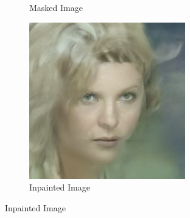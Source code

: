 \begin{figure}[H]
\begin{subfigure}[b]{0.25\textwidth}
        \caption{Masked Image}
    \end{subfigure}
    \begin{subfigure}[b]{0.25\textwidth}
        \includegraphics[width=\textwidth]{./figures/inpaint_steps1000_seed42_img_0}
        \caption{Inpainted Image}
    \end{subfigure}
\end{figure}